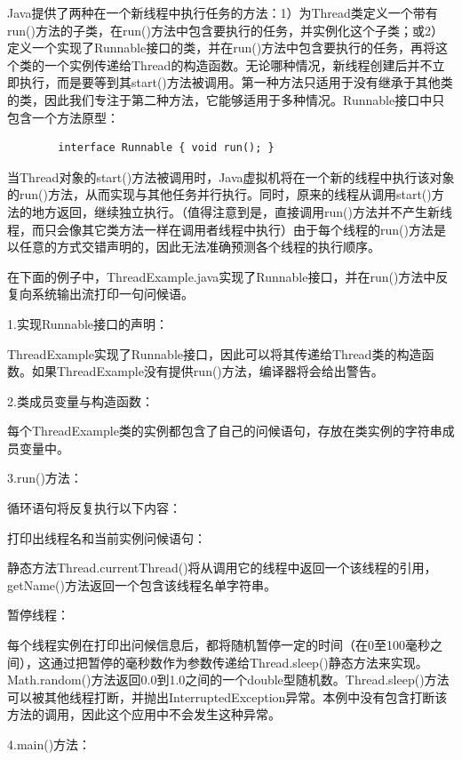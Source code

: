 		Java提供了两种在一个新线程中执行任务的方法：1）为Thread类定义一个带有run()方法的子类，在run()方法中包含要执行的任务，并实例化这个子类；或2）定义一个实现了Runnable接口的类，并在run()方法中包含要执行的任务，再将这个类的一个实例传递给Thread的构造函数。无论哪种情况，新线程创建后并不立即执行，而是要等到其start()方法被调用。第一种方法只适用于没有继承于其他类的类，因此我们专注于第二种方法，它能够适用于多种情况。Runnable接口中只包含一个方法原型： 

		\begin{verbatim}
		interface Runnable { void run(); } 
		\end{verbatim}

		当Thread对象的start()方法被调用时，Java虚拟机将在一个新的线程中执行该对象的run()方法，从而实现与其他任务并行执行。同时，原来的线程从调用start()方法的地方返回，继续独立执行。（值得注意到是，直接调用run()方法并不产生新线程，而只会像其它类方法一样在调用者线程中执行）由于每个线程的run()方法是以任意的方式交错声明的，因此无法准确预测各个线程的执行顺序。

		在下面的例子中，ThreadExample.java实现了Runnable接口，并在run()方法中反复向系统输出流打印一句问候语。 

		

		1.实现Runnable接口的声明：

		ThreadExample实现了Runnable接口，因此可以将其传递给Thread类的构造函数。如果ThreadExample没有提供run()方法，编译器将会给出警告。 

		2.类成员变量与构造函数：

		每个ThreadExample类的实例都包含了自己的问候语句，存放在类实例的字符串成员变量中。 

		3.run()方法：

		循环语句将反复执行以下内容： 

		打印出线程名和当前实例问候语句：

		静态方法Thread.currentThread()将从调用它的线程中返回一个该线程的引用，getName()方法返回一个包含该线程名单字符串。 

		暂停线程：

		每个线程实例在打印出问候信息后，都将随机暂停一定的时间（在0至100毫秒之间），这通过把暂停的毫秒数作为参数传递给Thread.sleep()静态方法来实现。Math.random()方法返回0.0到1.0之间的一个double型随机数。Thread.sleep()方法可以被其他线程打断，并抛出InterruptedException异常。本例中没有包含打断该方法的调用，因此这个应用中不会发生这种异常。 

		4.main()方法：

